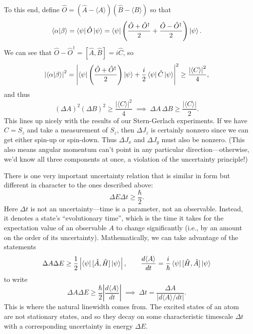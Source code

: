\documentclass[../p116main.tex]{subfiles}
\begin{document}
To this end, define $\hat O = (\hat A - \langle A \rangle)(\hat B - \langle B \rangle)$ so that
\[ \left< \alpha \middle| \beta \right> = \left< \psi \right| \hat O \left| \psi \right> = \left< \psi \right| \left( \frac{\hat O + \hat O^\dagger}{2} + \frac{\hat O - \hat O^\dagger}{2} \right) \left| \psi \right>. \]
We can see that $\hat O - \hat O^\dagger = [\hat A, \hat B] = i \hat C$, so
\[ \left| \left< \alpha \middle| \beta \right> \right|^2 = \left| \left< \psi \right| \left( \frac{\hat O + \hat O^\dagger}{2} \right) \left| \psi \right> + \frac{i}{2} \left< \psi \right| \hat C \left| \psi \right> \right|^2 \geq \frac{\left| \langle C \rangle \right|^2}{4}, \]
and thus
\[ (\Delta A)^2 (\Delta B)^2 \geq \frac{\left| \langle C \rangle \right|^2}{4} \;\implies\; \Delta A \, \Delta B \geq \frac{\left| \langle C \rangle \right|}{2}. \]
This lines up nicely with the results of our Stern-Gerlach experiments.
If we have $\hat C = S_z$ and take a measurement of $S_z$, then $\Delta J_z$ is certainly nonzero since we can get either spin-up or spin-down.
Thus $\Delta J_x$ and $\Delta J_y$ must also be nonzero.
(This also means angular momentum can't point in any particular direction---otherwise, we'd know all three components at once, a violation of the uncertainty principle!)

There is one very important uncertainty relation that is similar in form but different in character to the ones described above:
\[ \Delta E \Delta t \geq \frac{\hbar}{2}. \]
Here $\Delta t$ is not an uncertainty---time is a parameter, not an observable.
Instead, it denotes a state's ``evolutionary time'', which is the time it takes for the expectation value of an observable $A$ to change significantly (i.e., by an amount on the order of its uncertainty).
Mathematically, we can take advantage of the statements
\[ \Delta A \Delta E \geq \frac{1}{2} \left| \left< \psi \right| [\hat A, \hat H] \left| \psi \right> \right|, \qquad \frac{d \langle A \rangle}{dt} = \frac{i}{\hbar} \left< \psi \right| [\hat H, \hat A] \left| \psi \right> \]
to write
\[ \Delta A \Delta E \geq \frac{\hbar}{2} \left| \frac{d \langle A \rangle}{dt} \right| \;\implies\; \Delta t = \frac{\Delta A}{|d \langle A \rangle / dt|}. \]
This is where the natural linewidth comes from.
The excited states of an atom are not stationary states, and so they decay on some characteristic timescale $\Delta t$ with a corresponding uncertainty in energy $\Delta E$.
\end{document}
